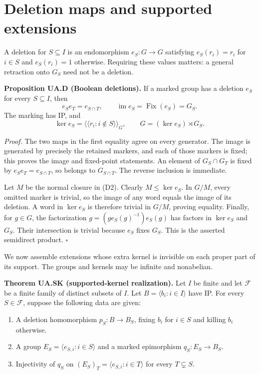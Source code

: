 \section{Deletion maps and supported extensions}\label{deletion-maps-and-supported-extensions}

A deletion for \(S\subseteq I\) is an endomorphism \(e_S:G\to G\)
satisfying \(e_S(r_i)=r_i\) for \(i\in S\) and \(e_S(r_i)=1\) otherwise.
Requiring these values matters: a general retraction onto \(G_S\) need
not be a deletion.

\textbf{Proposition UA.D (Boolean deletions).} If a marked group has a
deletion \(e_S\) for every \(S\subseteq I\), then \[
e_Se_T=e_{S\cap T},\qquad \operatorname{im}e_S=\operatorname{Fix}(e_S)=G_S.
\tag{D1}
\] The marking has IP, and \[
\ker e_S=\langle\!\langle r_i:i\notin S\rangle\!\rangle_G,
\qquad G=(\ker e_S)\rtimes G_S.
\tag{D2}
\]

\emph{Proof.} The two maps in the first equality agree on every
generator. The image is generated by precisely the retained markers, and
each of those markers is fixed; this proves the image and fixed-point
statements. An element of \(G_S\cap G_T\) is fixed by
\(e_Se_T=e_{S\cap T}\), so belongs to \(G_{S\cap T}\). The reverse
inclusion is immediate.

Let \(M\) be the normal closure in (D2). Clearly \(M\leq\ker e_S\). In
\(G/M\), every omitted marker is trivial, so the image of any word
equals the image of its deletion. A word in \(\ker e_S\) is therefore
trivial in \(G/M\), proving equality. Finally, for \(g\in G\), the
factorization \(g=(g e_S(g)^{-1})e_S(g)\) has factors in \(\ker e_S\)
and \(G_S\). Their intersection is trivial because \(e_S\) fixes
\(G_S\). This is the asserted semidirect product. \(\square\)

We now assemble extensions whose extra kernel is invisible on each
proper part of its support. The groups and kernels may be infinite and
nonabelian.

\textbf{Theorem UA.SK (supported-kernel realization).} Let \(I\) be
finite and let \(\mathcal F\) be a finite family of distinct subsets of
\(I\). Let \(B=\langle b_i:i\in I\rangle\) have IP. For every
\(S\in\mathcal F\), suppose the following data are given:

\begin{enumerate}
\def\labelenumi{\arabic{enumi}.}
\tightlist
\item
  A deletion homomorphism \(p_S:B\to B_S\), fixing \(b_i\) for
  \(i\in S\) and killing \(b_i\) otherwise.
\item
  A group \(E_S=\langle e_{S,i}:i\in S\rangle\) and a marked epimorphism
  \(q_S:E_S\to B_S\).
\item
  Injectivity of \(q_S\) on \((E_S)_T=\langle e_{S,i}:i\in T\rangle\)
  for every \(T\subsetneq S\).
\end{enumerate}

